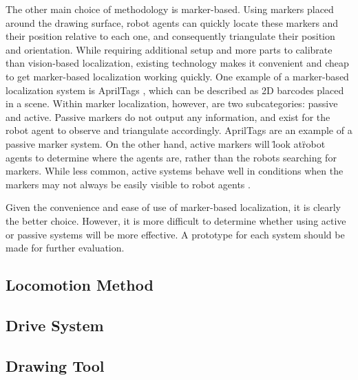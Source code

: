 The other main choice of methodology is marker-based. Using markers placed around the drawing surface, robot agents can quickly locate these markers and their position relative to each one, and consequently triangulate their position and orientation. While requiring additional setup and more parts to calibrate than vision-based localization, existing technology makes it convenient and cheap to get marker-based localization working quickly. One example of a marker-based localization system is AprilTags \cite{olson2011apriltag}, which can be described as 2D barcodes placed in a scene. Within marker localization, however, are two subcategories: passive and active. Passive markers do not output any information, and exist for the robot agent to observe and triangulate accordingly. AprilTags are an example of a passive marker system. On the other hand, active markers will \"look at\" robot agents to determine where the agents are, rather than the robots searching for markers. While less common, active systems behave well in conditions when the markers may not always be easily visible to robot agents \cite{cassinis2005active}.

Given the convenience and ease of use of marker-based localization, it is clearly the better choice. However, it is more difficult to determine whether using active or passive systems will be more effective. A prototype for each system should be made for further evaluation.


\subsection{Locomotion Method}

\subsection{Drive System}

\subsection{Drawing Tool}
